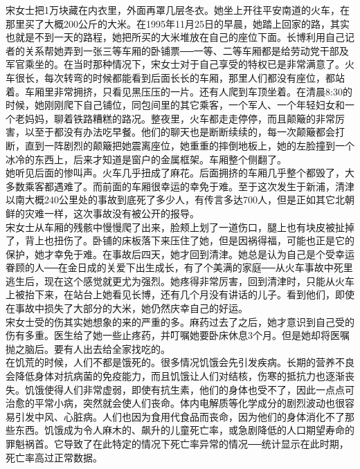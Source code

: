 宋女士把1万块藏在内衣里，外面再罩几层冬衣。她坐上开往平安南道的火车，在那里买了大概200公斤的大米。在1995年11月25日的早晨，她踏上回家的路，其实也就是不到一天的路程，她把所买的大米堆放在自己的座位下面。长博利用自己记者的关系帮她弄到一张三等车厢的卧铺票──一等、二等车厢都是给劳动党干部及军官乘坐的。在当时那种情况下，宋女士对于自己享受的特权已是非常满意了。火车很长，每次转弯的时候都能看到后面长长的车厢，那里人们都没有座位，都站着。车厢里非常拥挤，只看见黑压压的一片。还有人爬到车顶坐着。在清晨8:30的时候，她刚刚爬下自己铺位，同包间里的其它乘客，一个军人、一个年轻妇女和一个老妈妈，聊着铁路糟糕的路况。整夜里，火车都走走停停，而且颠簸的非常厉害，以至于都没有办法吃早餐。他们的聊天也是断断续续的，每一次颠簸都会打断，直到一阵剧烈的颠簸把她震离座位，她重重的摔倒地板上，她的左脸撞到一个冰冷的东西上，后来才知道是窗户的金属框架。车厢整个侧翻了。\\

她听见后面的惨叫声。火车几乎扭成了麻花。后面拥挤的车厢几乎整个都毁了，大多数乘客都遇难了。而前面的车厢很幸运的幸免于难。至于这次发生于新浦，清津以南大概240公里处的事故到底死了多少人，有传言多达700人，但是正如其它北朝鲜的灾难一样，这次事故没有被公开的报导。\\

宋女士从车厢的残骸中慢慢爬了出来，脸颊上划了一道伤口，腿上也有块皮被扯掉了，背上也扭伤了。卧铺的床板落下来压住了她，但是因祸得福，可能也正是它的保护，她才幸免于难。在事故后四天，她才回到清津。她总是认为自己是个受幸运眷顾的人──在金日成的关爱下出生成长，有了个美满的家庭──从火车事故中死里逃生后，现在这个感觉就更尤为强烈。她疼得非常厉害，回到清津时，只能从火车上被抬下来，在站台上她看见长博，还有几个月没有讲话的儿子。看到他们，即使在事故中损失了大部分的大米，她仍然庆幸自己的好运。\\

宋女士受的伤其实她想象的来的严重的多。麻药过去了之后，她才意识到自己受的伤有多重。医生给了她一些止疼药，并叮嘱她要卧床休息3个月。但是她却将医嘱抛之脑后。要有人出去给全家找吃的。\\

在饥荒的时候，人们不都是饿死的。很多情况饥饿会先引发疾病。长期的营养不良会降低身体对抗病菌的免疫能力，而且饥饿让人们对结核，伤寒的抵抗力也逐渐丧失。饥饿使得人们非常虚弱，即使有抗生素，他们的身体也受不了，因此一点点可治愈的平常小病，突然就会使人们丧命。体内电解质等化学成分的剧烈波动也很容易引发中风、心脏病。人们也因为食用代食品而丧命，因为他们的身体消化不了那些东西。饥饿成为令人麻木的、飙升的儿童死亡率，或急剧降低的人口期望寿命的罪魁祸首。它导致了在此特定的情况下死亡率异常的情况──统计显示在此时期，死亡率高过正常数据。\\

